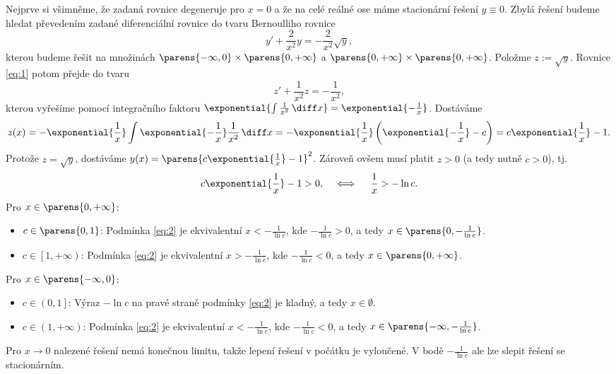 \documentclass[answers]{exam}
\begin{document}
\begin{questions}
	\begin{solution}
		Nejprve si všimněme, že zadaná rovnice degeneruje pro $x = 0$ a že na celé reálné ose máme stacionární řešení $y \equiv 0$. Zbylá řešení budeme hledat převedením zadané diferenciální rovnice do tvaru Bernoulliho rovnice
  	\begin{equation}
  		\label{eq:1}
			y'
			+
			\frac{2}{x^2}
			y
			=
			-
			\frac{2}{x^2} \sqrt{y}, 	
  	\end{equation}
  	kterou budeme řešit na množinách $\parens{-\infty, 0} \times \parens{0, +\infty}$ a $\parens{0, +\infty} \times \parens{0, +\infty}$. Položme $z := \sqrt{y}$. Rovnice \eqref{eq:1} potom přejde do tvaru
  	\begin{equation*}
  		z'
  		+
  		\frac{1}{x^2} z
  		=
  		-
  		\frac{1}{x^2},
  	\end{equation*}
  	kterou vyřešíme pomocí integračního faktoru $\exponential{\int \frac{1}{x^2} \, \diff x} = \exponential{-\frac{1}{x}}$. Dostáváme
  	\begin{equation*}
  		z(x) 
  		= 
  		- 
  		\exponential{\frac{1}{x}} \int \exponential{-\frac{1}{x}} \frac{1}{x^2} \, \diff x
  		=
  		-
  		\exponential{\frac{1}{x}}
  		\left(
  			\exponential{-\frac{1}{x}} - c
  		\right)
  		=
  		c \exponential{\frac{1}{x}} - 1.
  	\end{equation*}
  	Protože $z = \sqrt{y}$, dostáváme $y(x) = \parens{c \exponential{\frac{1}{x}} - 1}^2$. Zároveň ovšem musí platit $z > 0$ (a tedy nutně $c > 0$), tj.
  	\begin{equation}
  		\label{eq:2}
  		c \exponential{\frac{1}{x}} - 1 > 0,
  		\quad \iff \quad 
  		\frac{1}{x} > - \ln c.
  	\end{equation}
  	Pro $x \in \parens{0, +\infty}$:
  	\begin{itemize}
  		\item $c \in \parens{0, 1}$: Podmínka \eqref{eq:2} je ekvivalentní $x < -\frac{1}{\ln c}$, kde $-\frac{1}{\ln c} > 0$, a tedy $x \in \parens{0, -\frac{1}{\ln c}}$.
  		\item $c \in \left[ 1, +\infty \right)$: Podmínka \eqref{eq:2} je ekvivalentní $x > -\frac{1}{\ln c}$, kde $-\frac{1}{\ln c} < 0$,  a tedy $x \in \parens{0, +\infty}$.
  	\end{itemize}
  	Pro $x \in \parens{-\infty, 0}$:
  	\begin{itemize}
  		\item $c \in \left( 0, 1 \right]$: Výraz $-\ln c$ na pravé straně podmínky \eqref{eq:2} je kladný, a tedy $x \in \emptyset$.
  		\item $c \in \left( 1, +\infty \right)$: Podmínka \eqref{eq:2} je ekvivalentní $x < -\frac{1}{\ln c}$, kde $-\frac{1}{\ln c} < 0$,  a tedy $x \in \parens{-\infty, -\frac{1}{\ln c}}$.
  	\end{itemize}
  	Pro $x \to 0$ nalezené řešení nemá konečnou limitu, takže lepení řešení v počátku je vyloučené. V bodě $-\frac{1}{\ln c}$ ale lze slepit řešení se stacionárním.
  	

\end{solution}
\end{questions}
\end{document}

